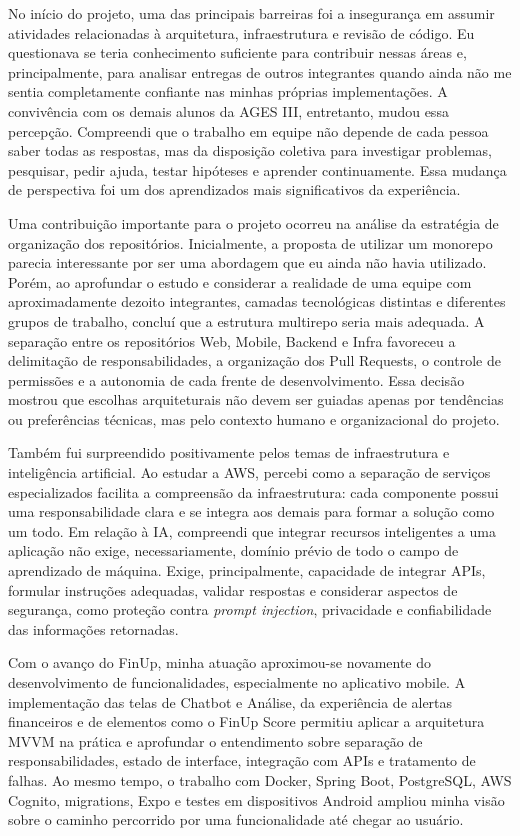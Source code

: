 No início do projeto, uma das principais barreiras foi a insegurança em assumir
atividades relacionadas à arquitetura, infraestrutura e revisão de código. Eu
questionava se teria conhecimento suficiente para contribuir nessas áreas e,
principalmente, para analisar entregas de outros integrantes quando ainda não me
sentia completamente confiante nas minhas próprias implementações. A convivência
com os demais alunos da AGES III, entretanto, mudou essa percepção. Compreendi
que o trabalho em equipe não depende de cada pessoa saber todas as respostas,
mas da disposição coletiva para investigar problemas, pesquisar, pedir ajuda,
testar hipóteses e aprender continuamente. Essa mudança de perspectiva foi um
dos aprendizados mais significativos da experiência.

Uma contribuição importante para o projeto ocorreu na análise da estratégia de
organização dos repositórios. Inicialmente, a proposta de utilizar um monorepo
parecia interessante por ser uma abordagem que eu ainda não havia utilizado.
Porém, ao aprofundar o estudo e considerar a realidade de uma equipe com
aproximadamente dezoito integrantes, camadas tecnológicas distintas e diferentes
grupos de trabalho, concluí que a estrutura multirepo seria mais adequada. A
separação entre os repositórios Web, Mobile, Backend e Infra favoreceu a
delimitação de responsabilidades, a organização dos Pull Requests, o controle de
permissões e a autonomia de cada frente de desenvolvimento. Essa decisão mostrou
que escolhas arquiteturais não devem ser guiadas apenas por tendências ou
preferências técnicas, mas pelo contexto humano e organizacional do projeto.

Também fui surpreendido positivamente pelos temas de infraestrutura e
inteligência artificial. Ao estudar a AWS, percebi como a separação de serviços
especializados facilita a compreensão da infraestrutura: cada componente possui
uma responsabilidade clara e se integra aos demais para formar a solução como um
todo. Em relação à IA, compreendi que integrar recursos inteligentes a uma
aplicação não exige, necessariamente, domínio prévio de todo o campo de
aprendizado de máquina. Exige, principalmente, capacidade de integrar APIs,
formular instruções adequadas, validar respostas e considerar aspectos de
segurança, como proteção contra \textit{prompt injection}, privacidade e
confiabilidade das informações retornadas.

Com o avanço do FinUp, minha atuação aproximou-se novamente do desenvolvimento
de funcionalidades, especialmente no aplicativo mobile. A implementação das
telas de Chatbot e Análise, da experiência de alertas financeiros e de elementos
como o FinUp Score permitiu aplicar a arquitetura MVVM na prática e aprofundar o
entendimento sobre separação de responsabilidades, estado de interface,
integração com APIs e tratamento de falhas. Ao mesmo tempo, o trabalho com
Docker, Spring Boot, PostgreSQL, AWS Cognito, migrations, Expo e testes em
dispositivos Android ampliou minha visão sobre o caminho percorrido por uma
funcionalidade até chegar ao usuário.

